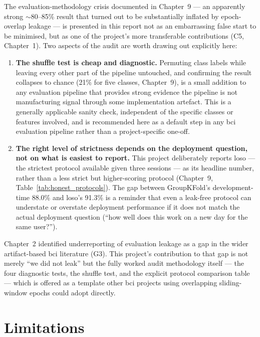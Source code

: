 The evaluation-methodology crisis documented in Chapter~9 --- an
apparently strong $\sim$80--85\% result that turned out to be
substantially inflated by epoch-overlap leakage --- is presented in
this report not as an embarrassing false start to be minimised, but
as one of the project's more transferable contributions (C5,
Chapter~1). Two aspects of the audit are worth drawing out
explicitly here:

\begin{enumerate}[leftmargin=*]
    \item \textbf{The shuffle test is cheap and diagnostic.}
    Permuting class labels while leaving every other part of the
    pipeline untouched, and confirming the result collapses to
    chance (21\% for five classes, Chapter~9), is a small addition
    to any evaluation pipeline that provides strong evidence the
    pipeline is not manufacturing signal through some
    implementation artefact. This is a generally applicable sanity
    check, independent of the specific classes or features involved,
    and is recommended here as a default step in any \acrshort{bci}
    evaluation pipeline rather than a project-specific one-off.
    \item \textbf{The right level of strictness depends on the
    deployment question, not on what is easiest to report.} This
    project deliberately reports \acrshort{loso} --- the strictest
    protocol available given three sessions --- as its headline
    number, rather than a less strict but higher-scoring protocol
    (Chapter~9, Table~\ref{tab:honest_protocols}). The gap
    between GroupKFold's development-time 88.0\% and \acrshort{loso}'s
    91.3\% is a reminder that even a leak-free protocol can
    understate or overstate deployment performance if it does not
    match the actual deployment question (``how well does this work
    on a new day for the same user?'').
\end{enumerate}

Chapter~2 identified underreporting of evaluation leakage as a gap
in the wider artifact-based \acrshort{bci} literature (G3). This
project's contribution to that gap is not merely ``we did not leak''
but the fully worked audit methodology itself --- the four
diagnostic tests, the shuffle test, and the explicit protocol
comparison table --- which is offered as a template other
\acrshort{bci} projects using overlapping sliding-window epochs
could adopt directly.

\section{Limitations}
\label{sec:disc_limitations}

